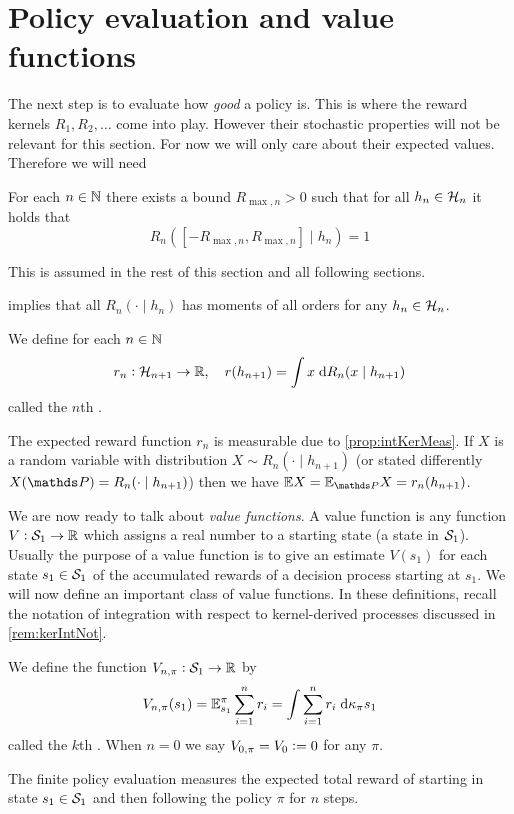 \section{Policy evaluation and value functions}
The next step is to evaluate how \emph{good} a policy is.
This is where the reward kernels $R_1, R_2, \dots$ come into play.
However their stochastic properties will not be
relevant for this section. For now we will
only care about their expected values. Therefore we will need
\begin{asm} \label{asm:finRewBound}
  For each $n \in \mathbb{N}$ there exists a bound $R_{\max, n} > 0$
  such that for all $h_n \in \mathcal{H}_n$ it holds that
  \[ R_n([-R_{\max, n}, R_{\max, n}] \mid h_n) = 1 \] 
\end{asm}
This is assumed in the rest of this section and all following sections.
\begin{rem} \label{rem:expRewMom}
   implies that all $R_n(\cdot \mid h_n)$ has moments of
  all orders for any $h_n \in \mathcal{H}_n$.
\end{rem}
\begin{defn} \label{defn:expRewFunc}
  We define for each $n \in \mathbb{N}$
  \[ r_n : \mathcal{H}_{n+1} \to \mathbb{R}, \quad r(h_{n+1})
  = \int x \; \mathrm{d} R_n(x \mid h_{n+1}) \]
  called the $n$th .
\end{defn}
\begin{rem} \label{rem:expRewMeas}
  The expected reward function $r_n$ is measurable due to
  \cref{prop:intKerMeas}.
  If $X$ is a random variable with distribution
  $X \sim R_n(\cdot \mid h_{n+1})$ (or stated differently
  $X(\Prob) = R_n(\cdot \mid h_{n+1})$)
  then we have $\E X = \E_{\Prob} X = r_n(h_{n+1})$. 
\end{rem}

We are now ready to talk about \emph{value functions}.
A value function is any function $V: \mathcal{S}_1 \to \mathbb{R}$
which assigns a real number to a starting state (a state in $\mathcal{S}_1$).
Usually the purpose of a value function is to give an estimate $V(s_1)$ for each
state $s_1 \in \mathcal{S}_1$ of the accumulated
rewards of a decision process starting at $s_1$.
We will now define an important class of value functions.
In these definitions,
recall the notation of integration with respect to kernel-derived processes
discussed in \cref{rem:kerIntNot}.

\begin{defn}
  We define the function $V_{n, \pi} : \mathcal{S}_1 \to \mathbb{R}$ by
  \[ V_{n,\pi}(s_1) = \mathbb{E}_{s_1}^\pi \sum_{i=1}^n r_i
    = \int \sum_{i=1}^n r_i
  \; \mathrm{d} \kappa_\pi s_1 \]
  called the $k$th .
  When $n=0$ we say $V_{0,\pi} = V_0 \vcentcolon= 0$ for any $\pi$.
\end{defn}
The finite policy evaluation
measures the expected total reward of starting in state $s_1 \in \mathcal{S}_1$
and then following the policy $\pi$ for $n$ steps.

